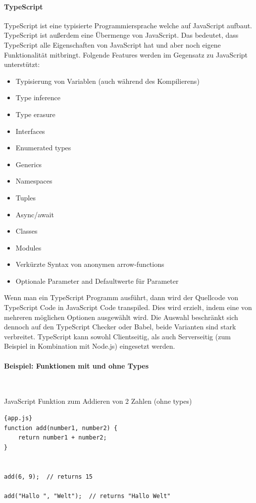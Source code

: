 \paragraph{TypeScript}
\label{TypeScript}
TypeScript ist eine typisierte Programmiersprache welche auf JavaScript aufbaut.
TypeScript ist außerdem eine Übermenge von JavaScript.
Das bedeutet, dass TypeScript alle Eigenschaften von JavaScript hat und aber noch eigene Funktionalität mitbringt.
Folgende Features werden im Gegensatz zu JavaScript unterstützt:

\begin{itemize}
    \item Typisierung von Variablen (auch während des Kompilierens)
    \item Type inference
    \item Type erasure
    \item Interfaces
    \item Enumerated types
    \item Generics
    \item Namespaces
    \item Tuples
    \item Async/await
    \item Classes
    \item Modules
    \item Verkürzte Syntax von anonymen arrow-functions
    \item Optionale Parameter and Defaultwerte für Parameter
\end{itemize}

Wenn man ein TypeScript Programm ausführt, dann wird der Quellcode von TypeScript Code in JavaScript Code transpiled.
Dies wird erzielt, indem eine von mehreren möglichen Optionen ausgewählt wird.
Die Auswahl beschränkt sich dennoch auf den TypeScript Checker oder Babel, beide Varianten sind stark verbreitet.
TypeScript kann sowohl Clientseitig, als auch Serverseitig (zum Beispiel in Kombination mit Node.js) eingesetzt werden.

\paragraph{Beispiel: Funktionen mit und ohne Types} \

JavaScript Funktion zum Addieren von 2 Zahlen (ohne types)
\begin{lstlisting}[label={lst:add-function-js}]{app.js}
function add(number1, number2) {
    return number1 + number2;
}


add(6, 9);  // returns 15

add("Hallo ", "Welt");  // returns "Hallo Welt"
\end{lstlisting}

